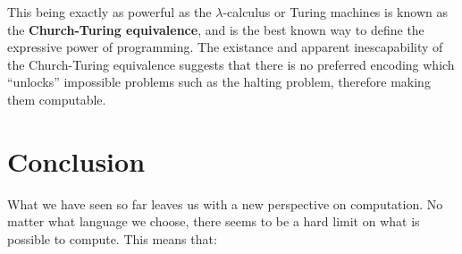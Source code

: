 This being exactly as powerful as the $\lambda$-calculus or Turing machines is known as the \textbf{Church-Turing equivalence}, and is the best known way to define the expressive power of programming. The existance and apparent inescapability of the Church-Turing equivalence suggests that there is no preferred encoding which ``unlocks'' impossible problems such as the halting problem, therefore making them computable.



\section{Conclusion}







What we have seen so far leaves us with a new perspective on computation. No matter what language we choose, there seems to be a hard limit on what is possible to compute. This means that:

